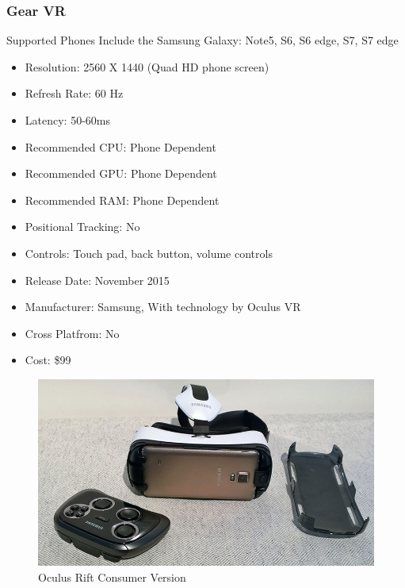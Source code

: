 \documentclass[a4paper,10pt]{article}
\begin{document}
\subsubsection{Gear VR}
	Supported Phones Include the Samsung Galaxy: Note5, S6, S6 edge, S7, S7 edge  
	\begin{itemize}
	  \item Resolution: 2560 X 1440 (Quad HD phone screen)
	  \item Refresh Rate: 60 Hz
	  \item Latency: 50-60ms
	  \item Recommended CPU: Phone Dependent
	  \item Recommended GPU: Phone Dependent
	  \item Recommended RAM: Phone Dependent
	  \item Positional Tracking: No
	  \item Controls: Touch pad, back button, volume controls
	  \item Release Date: November 2015
	  \item Manufacturer: Samsung, With technology by Oculus VR
	  \item Cross Platfrom: No
	  \item Cost: \$99
	\end{itemize}
	\begin{figure}[H]
	\includegraphics[width=\linewidth,height=\paperheight,keepaspectratio]{gear.jpg}
	\caption{Oculus Rift Consumer Version}
	\label{fig:GearImg}
	\end{figure}
	\pagebreak
\end{document}
